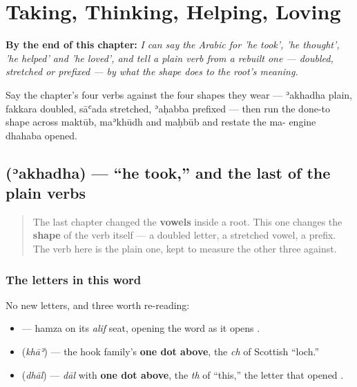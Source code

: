 
\chapter{Taking, Thinking, Helping, Loving}
\label{ch:ar-taking-thinking-helping-loving}

\begin{chapteropening}
\textbf{By the end of this chapter:} \emph{I can say the Arabic for 'he took', 'he thought', 'he helped' and 'he loved', and tell a plain verb from a rebuilt one — doubled, stretched or prefixed — by what the shape does to the root's meaning.}

Say the chapter's four verbs against the four shapes they wear — ʾakhadha plain, fakkara doubled, sāʿada stretched, ʾaḥabba prefixed — then run the done-to shape across maktūb, maʾkhūdh and maḥbūb and restate the ma- engine dhahaba opened.
\end{chapteropening}

\section[\texorpdfstring{\ar{أخذ} (ʾakhadha)}{أخذ (ʾakhadha)}]{ (ʾakhadha) — \textquotedblleft{}he took,\textquotedblright{} and the last of the plain verbs}

\label{lesson:AR-C32-akhadha}



\begin{quote}
The last chapter changed the \textbf{vowels} inside a root. This one changes the \textbf{shape} of the verb itself — a doubled letter, a stretched vowel, a prefix. The verb here is the plain one, kept to measure the other three against.
\end{quote}

\subsection*{The letters in this word}
No new letters, and three worth re-reading:

\begin{itemize}
\raggedright
  \item \textbf{} — hamza on its \emph{alif} seat, opening the word as it opens \textbf{}.
  \item \textbf{} (\emph{khāʾ}) — the hook family's \textbf{one dot above}, the \emph{ch} of Scottish \textquotedblleft{}loch.\textquotedblright{}
  \item \textbf{} (\emph{dhāl}) — \emph{dāl} with \textbf{one dot above}, the \emph{th} of \textquotedblleft{}this,\textquotedblright{} the letter that opened \textbf{}.
\end{itemize}

